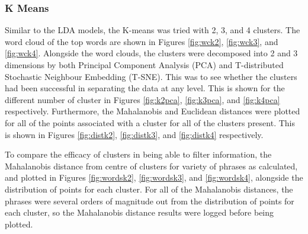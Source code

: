\subsubsection{K Means}
Similar to the LDA models, the K-means was tried with 2, 3, and 4 clusters. The word cloud of the top words are shown in Figures \ref{fig:wck2}, \ref{fig:wck3}, and \ref{fig:wck4}. Alongside the word clouds, the clusters were decomposed into 2 and 3 dimensions by both Principal Component Analysis (PCA) and T-distributed Stochastic Neighbour Embedding (T-SNE). This was to see whether the clusters had been successful in separating the data at any level. This is shown for the different number of cluster in Figures \ref{fig:k2pca}, \ref{fig:k3pca}, and \ref{fig:k4pca} respectively. Furthermore, the Mahalanobis and Euclidean distances were plotted for all of the points associated with a cluster for all of the clusters present. This is shown in Figures \ref{fig:distk2}, \ref{fig:distk3}, and \ref{fig:distk4} respectively. 

To compare the efficacy of clusters in being able to filter information, the Mahalanobis distance from centre of clusters for variety of phrases as calculated, and plotted in Figures \ref{fig:wordsk2}, \ref{fig:wordsk3}, and \ref{fig:wordsk4}, alongside the distribution of points for each cluster. For all of the Mahalanobis distances, the phrases were several orders of magnitude out from the distribution of points for each cluster, so the Mahalanobis distance results were logged before being plotted.  
